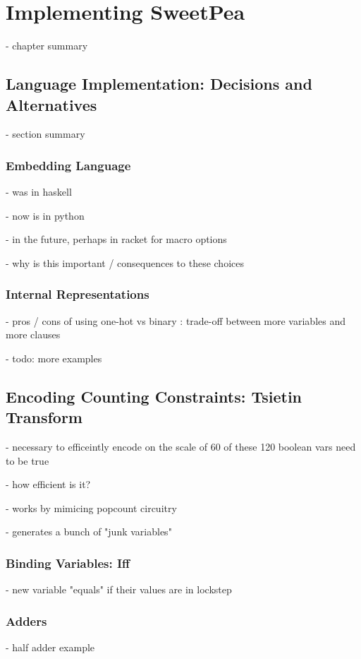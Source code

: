 
\chapter{Implementing SweetPea}

- chapter summary

\section{Language Implementation: Decisions and Alternatives}

- section summary

\subsection{Embedding Language}

- was in haskell

- now is in python

- in the future, perhaps in racket for macro options

- why is this important / consequences to these choices

\subsection{Internal Representations}

- pros / cons of using one-hot vs binary : trade-off between more variables and more clauses

- todo: more examples

\section{Encoding Counting Constraints: Tsietin Transform}
- necessary to efficeintly encode on the scale of 60 of these 120 boolean vars need to be true

- how efficient is it?

- works by mimicing popcount circuitry

- generates a bunch of "junk variables"

\subsection{Binding Variables: Iff}
- new variable "equals" if their values are in lockstep

\subsection{Adders}
- half adder example

